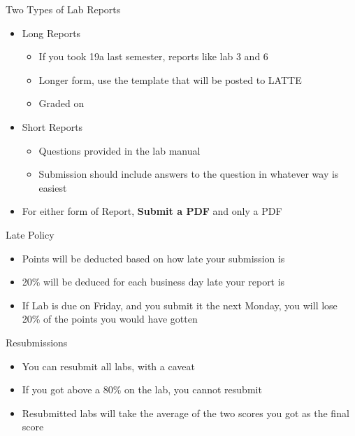 \documentclass{beamer}
\begin{document}
\begin{frame}{Two Types of Lab Reports}
  \begin{itemize}
  \item Long Reports
    \begin{itemize}
    \item If you took 19a last semester, reports like lab 3 and 6
    \item Longer form, use the template that will be posted to LATTE
    \item Graded on 
    \end{itemize}
  \item Short Reports
    \begin{itemize}
    \item Questions provided in the lab manual
    \item Submission should include answers to the question in whatever way is easiest
    \end{itemize}
  \item For either form of Report, \textbf{Submit a PDF} and only a PDF
  \end{itemize}
\end{frame}

\begin{frame}{Late Policy}
  \begin{itemize}
  \item Points will be deducted based on how late your submission is
  \item 20\% will be deduced for each business day late your report is
  \item If Lab is due on Friday, and you submit it the next Monday, you will lose 20\% of the points you would have gotten    
  \end{itemize}
\end{frame}

\begin{frame}{Resubmissions}
  \begin{itemize}
  \item You can resubmit all labs, with a caveat
  \item If you got above a 80\% on the lab, you cannot resubmit
  \item Resubmitted labs will take the average of the two scores you got as the final score
  \end{itemize}
\end{frame}
\end{document}
